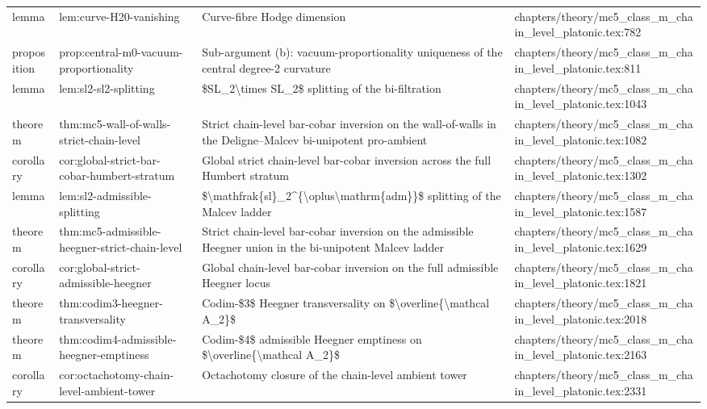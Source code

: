 \documentclass[11pt]{article}
\begin{document}
\begin{longtable}{L{0.10\textwidth}L{0.26\textwidth}L{0.42\textwidth}L{0.22\textwidth}}
lemma & lem:curve-H20-vanishing & Curve-fibre Hodge dimension & chapters/theory/mc5\_class\_m\_chain\_level\_platonic.tex:782\\
proposition & prop:central-m0-vacuum-proportionality & Sub-argument (b): vacuum-proportionality uniqueness of the central degree-2 curvature & chapters/theory/mc5\_class\_m\_chain\_level\_platonic.tex:811\\
lemma & lem:sl2-sl2-splitting & \$SL\_2\textbackslash{}times SL\_2\$ splitting of the bi-filtration & chapters/theory/mc5\_class\_m\_chain\_level\_platonic.tex:1043\\
theorem & thm:mc5-wall-of-walls-strict-chain-level & Strict chain-level bar-cobar inversion on the wall-of-walls in the Deligne--Malcev bi-unipotent pro-ambient & chapters/theory/mc5\_class\_m\_chain\_level\_platonic.tex:1082\\
corollary & cor:global-strict-bar-cobar-humbert-stratum & Global strict chain-level bar-cobar inversion across the full Humbert stratum & chapters/theory/mc5\_class\_m\_chain\_level\_platonic.tex:1302\\
lemma & lem:sl2-admissible-splitting & \$\textbackslash{}mathfrak\{sl\}\_2\textasciicircum{}\{\textbackslash{}oplus\textbackslash{}mathrm\{adm\}\}\$ splitting of the Malcev ladder & chapters/theory/mc5\_class\_m\_chain\_level\_platonic.tex:1587\\
theorem & thm:mc5-admissible-heegner-strict-chain-level & Strict chain-level bar-cobar inversion on the admissible Heegner union in the bi-unipotent Malcev ladder & chapters/theory/mc5\_class\_m\_chain\_level\_platonic.tex:1629\\
corollary & cor:global-strict-admissible-heegner & Global chain-level bar-cobar inversion on the full admissible Heegner locus & chapters/theory/mc5\_class\_m\_chain\_level\_platonic.tex:1821\\
theorem & thm:codim3-heegner-transversality & Codim-\$3\$ Heegner transversality on \$\textbackslash{}overline\{\textbackslash{}mathcal A\_2\}\$ & chapters/theory/mc5\_class\_m\_chain\_level\_platonic.tex:2018\\
theorem & thm:codim4-admissible-heegner-emptiness & Codim-\$4\$ admissible Heegner emptiness on \$\textbackslash{}overline\{\textbackslash{}mathcal A\_2\}\$ & chapters/theory/mc5\_class\_m\_chain\_level\_platonic.tex:2163\\
corollary & cor:octachotomy-chain-level-ambient-tower & Octachotomy closure of the chain-level ambient tower & chapters/theory/mc5\_class\_m\_chain\_level\_platonic.tex:2331\\

\end{longtable}
\end{document}
